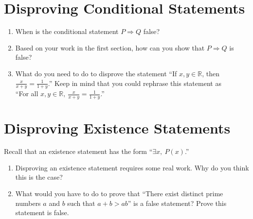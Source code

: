 \documentclass[12 pt]{article}
\newcommand{\R}{\mathbb{R}}
\newcommand{\Ra}{\Rightarrow}
\newcommand{\ds}{\displaystyle}
\theoremstyle{definition}
\theoremstyle{plain}
\theoremstyle{mytheorem}
\theoremstyle{myexample}
\theoremstyle{mydefinition}
\begin{document}
\section{Disproving Conditional Statements}
\begin{enumerate}[resume] \itemsep=.9in
\item When is the conditional statement $P \Ra Q$ false?
\item Based on your work in the first section, how can you show that $P \Ra Q$ is false?
\newpage
\item What do you need to do to disprove the statement ``If $x,y \in \R$, then $\ds \frac{x}{x+y} = \frac{1}{1+y}$.''  Keep in mind that you could rephrase this statement as \\``For all $\ds  x,y \in \R, \ \frac{x}{x+y} = \frac{1}{1+y}$.''
\vspace{1in}
\end{enumerate}

\section{Disproving Existence Statements}
Recall that an existence statement has the form ``$\exists x, \ P(x)$.''
\begin{enumerate}[resume] \itemsep=1in
\item  Disproving an existence statement requires some real work.  Why do you think this is the case?
\item What would you have to do to prove that ``There exist distinct prime numbers $a$ and $b$ such that $a+b > ab$'' is a false statement?  Prove this statement is false.
\end{enumerate}
\end{document}
